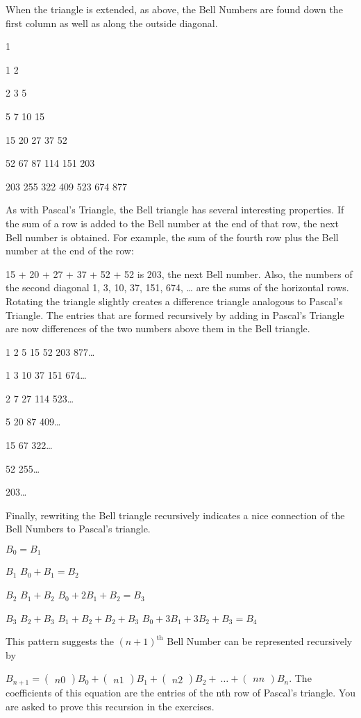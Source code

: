 \documentclass[10pt,letter]{article}
\begin{document}
When the triangle is extended, as above, the Bell Numbers are found down
the first column as well as along the outside diagonal.

1

1 2

2 3 5

5 7 10 15

15 20 27 37 52

52 67 87 114 151 203

203 255 322 409 523 674 877

As with Pascal's Triangle, the Bell triangle has several interesting
properties. If the sum of a row is added to the Bell number at the end
of that row, the next Bell number is obtained. For example, the sum of
the fourth row plus the Bell number at the end of the row:

15 + 20 + 27 + 37 + 52 + 52 is 203, the next Bell number. Also, the
numbers of the second diagonal 1, 3, 10, 37, 151, 674, \ldots{} are the
sums of the horizontal rows. Rotating the triangle slightly creates a
difference triangle analogous to Pascal's Triangle. The entries that are
formed recursively by adding in Pascal's Triangle are now differences of
the two numbers above them in the Bell triangle.

1 2 5 15 52 203 877\ldots{}

1 3 10 37 151 674\ldots{}

2 7 27 114 523\ldots{}

5 20 87 409\ldots{}

15 67 322\ldots{}

52 255\ldots{}

203\ldots{}

Finally, rewriting the Bell triangle recursively indicates a nice
connection of the Bell Numbers to Pascal's triangle.

\(B_{0} = B_{1}\)

\(B_{1}\) \(B_{0} + B_{1} = B_{2}\)

\(B_{2}\) \(B_{1} + B_{2}\) \(B_{0} + 2B_{1} + B_{2} = B_{3}\)

\(B_{3}\) \(B_{2} + B_{3}\) \(B_{1} + B_{2} + B_{2} + B_{3}\)
\(B_{0} + 3B_{1} + 3B_{2} + B_{3} = B_{4}\)

This pattern suggests the \({(n + 1)}^{\text{th}}\) Bell Number can be
represented recursively by

\(B_{n + 1} =
\begin{pmatrix}
n
0
\end{pmatrix}
B_{0} +
\begin{pmatrix}
n
1
\end{pmatrix}
B_{1} +
\begin{pmatrix}
n
2
\end{pmatrix}
B_{2} + \ \ldots +
\begin{pmatrix}
n
n
\end{pmatrix}
B_{n}\). The coefficients of this equation are the entries
of the nth row of Pascal's triangle. You are asked to prove this
recursion in the exercises.
\end{document}
